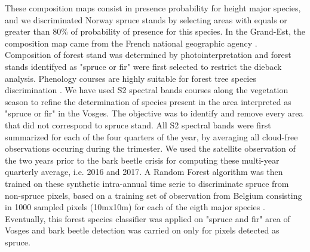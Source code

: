 \documentclass[3p,procedia]{elsarticle}
\begin{document}
These composition maps consist in presence probability for height major species, and we discriminated Norway spruce stands by selecting areas with equals or greater than 80\% of probability of presence for this species.  
In the Grand-Est, the composition map came from the French national geographic agency \citep{IGN_bd_2018}. 
Composition of forest stand was determined by photointerpretation and forest stands identifyed as "spruce or fir" were first selected to restrict the dieback analysis. Phenology courses are highly suitable for forest tree species discrimination \citep{lisein_discrimination_2015,grabska_forest_2019,ma_tree_2021}.
We have used S2 spectral bands courses along the vegetation season to refine the determination of species present in the area interpreted as "spruce or fir" in the Vosges.
The objective was to identify and remove every area that did not correspond to spruce stand.
All S2 spectral bands were first summarized for each of the four quarters of the year, by averaging all cloud-free observations occuring during the trimester.
We used the satellite observation of the two years prior to the bark beetle crisis for computing these multi-year quarterly average, i.e. 2016 and 2017.
A Random Forest algorithm was then trained on these synthetic intra-annual time serie to discriminate spruce from non-spruce pixels, based on a training set of observation from Belgium consisting in 1000 sampled pixels (10mx10m) for each of the eigth major species \citep{bolyn_forest_2018}.
Eventually, this forest species classifier was applied on "spruce and fir" area of Vosges and bark beetle detection was carried on only for pixels detected as spruce.
\end{document}
